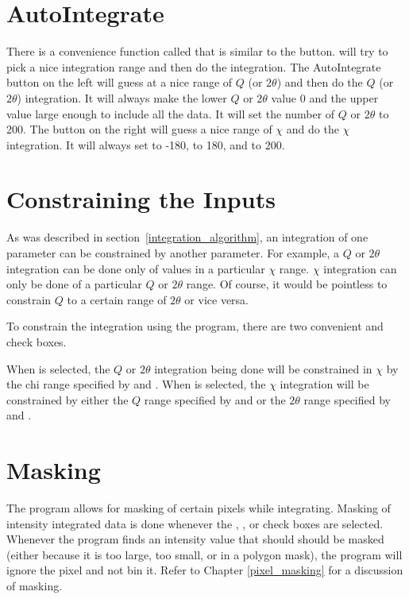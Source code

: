 \section{AutoIntegrate}

There is a convenience function called  
that is similar to the  button.
 will try to pick a nice integration range 
and then do the integration. The AutoIntegrate button 
on the left will guess at a nice range of $Q$ 
(or $2\theta$) and then do the $Q$ (or
$2\theta$) integration.
It will always make the lower $Q$ or $2\theta$ 
value 0 and the upper value large enough
to include all the data.
It will set the number of $Q$ or $2\theta$ to
200. The  button on the right 
will guess a nice range of $\chi$ and 
do the $\chi$ integration. It will always 
set  to -180,  to
180, and  to 200.

\section{Constraining the Inputs}

As was described in 
section~\ref{integration_algorithm}, an integration 
of one parameter can be constrained by another 
parameter. For example, a $Q$ or $2\theta$ 
integration can be done only of values in a 
particular $\chi$ range. $\chi$ integration 
can only be done of a particular $Q$ or $2\theta$ 
range. Of course, it would be pointless to 
constrain $Q$ to a certain range of $2\theta$
or vice versa.

To constrain the integration using the program,
there are two convenient 
 and 
 check boxes.

When  is
selected,
the $Q$ or $2\theta$ integration being done
will be constrained in $\chi$ by the chi
range specified by  and 
. When 
 is selected, 
the $\chi$ integration will be constrained by
either the $Q$ range specified by 
and  or the $2\theta$ range specified by 
 and .

\section{Masking}

The program allows for masking of certain
pixels while integrating. Masking of intensity 
integrated data is done whenever the
, ,
or  check boxes are selected.
Whenever the program finds an intensity value
that should should be masked (either because it 
is too large, too small, or in a polygon mask), the
program will ignore the pixel and not bin it.
Refer to Chapter \ref{pixel_masking} for a discussion
of masking.

